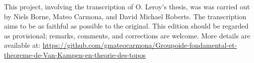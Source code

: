 \documentclass[12pt,twoside]{report} %
\theoremstyle{plain}
\theoremstyle{definition}
\begin{document}
\newpage 
\thispagestyle{empty}

\null\vfill
\noindent\begin{minipage}{\textwidth}
This project, involving the transcription of O. Leroy's thesis, was was carried out by Niels Borne, Mateo Carmona, and David Michael Roberts. The transcription aims to be as faithful as possible to the original. This edition should be regarded as provisional; remarks, comments, and corrections are welcome. More details are available at: \url{https://github.com/gmateocarmona/Groupoide-fondamental-et-theoreme-de-Van-Kampen-en-theorie-des-topos}
\end{minipage}

\newpage
\thispagestyle{empty}
\mbox{}


\renewcommand{\contentsname}{TABLE DES MATIÈRES}
\tableofcontents\thispagestyle{empty}

\setcounter{page}{1}









\newpage
\mbox{}
\thispagestyle{empty}
\end{document}
